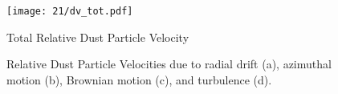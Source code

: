 \vfill

\begin{figure}[h!]
    \begin{center}
        \texttt{[image: 21/dv\_tot.pdf]}
    \end{center}
    \caption{Total Relative Dust Particle Velocity}
    \label{fig:total_relative_dust_particle_velocity}
\end{figure}

\newpage
\vfill

\begin{figure}[h!]
    \centering
    \begin{minipage}{.5\linewidth}
      \centering
    \end{minipage}%
    \begin{minipage}{.5\linewidth}
      \centering
    \end{minipage}
    \begin{minipage}{.5\linewidth}
      \centering
    \end{minipage}%
    \begin{minipage}{.5\linewidth}
      \centering
    \end{minipage}
    \caption{Relative Dust Particle Velocities due to radial drift (a), azimuthal motion (b), 
        Brownian motion (c), and turbulence (d).}
    \label{fig:relative_dust_particle_velocities}
\end{figure} \ \\
